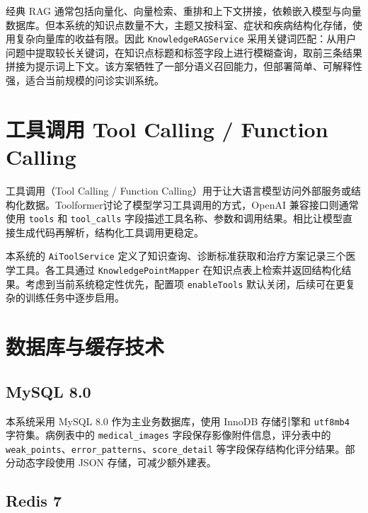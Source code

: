 经典 RAG 通常包括向量化、向量检索、重排和上下文拼接，依赖嵌入模型与向量数据库。但本系统的知识点数量不大，主题又按科室、症状和疾病结构化存储，使用复杂向量库的收益有限。因此 \texttt{KnowledgeRAGService} 采用关键词匹配：从用户问题中提取较长关键词，在知识点标题和标签字段上进行模糊查询，取前三条结果拼接为提示词上下文。该方案牺牲了一部分语义召回能力，但部署简单、可解释性强，适合当前规模的问诊实训系统。

\section{工具调用 Tool Calling / Function Calling}

工具调用（Tool Calling / Function Calling）用于让大语言模型访问外部服务或结构化数据。Toolformer\cite{schick2023toolformer}讨论了模型学习工具调用的方式，OpenAI 兼容接口则通常使用 \texttt{tools} 和 \texttt{tool\_calls} 字段描述工具名称、参数和调用结果。相比让模型直接生成代码再解析，结构化工具调用更稳定。

本系统的 \texttt{AiToolService} 定义了知识查询、诊断标准获取和治疗方案记录三个医学工具。各工具通过 \texttt{KnowledgePointMapper} 在知识点表上检索并返回结构化结果。考虑到当前系统稳定性优先，配置项 \texttt{enableTools} 默认关闭，后续可在更复杂的训练任务中逐步启用。

\section{数据库与缓存技术}

\subsection{MySQL 8.0}

本系统采用 MySQL 8.0 作为主业务数据库，使用 InnoDB 存储引擎和 \texttt{utf8mb4} 字符集。病例表中的 \texttt{medical\_images} 字段保存影像附件信息，评分表中的 \texttt{weak\_points}、\texttt{error\_patterns}、\texttt{score\_detail} 等字段保存结构化评分结果。部分动态字段使用 JSON 存储，可减少额外建表。

\subsection{Redis 7}

